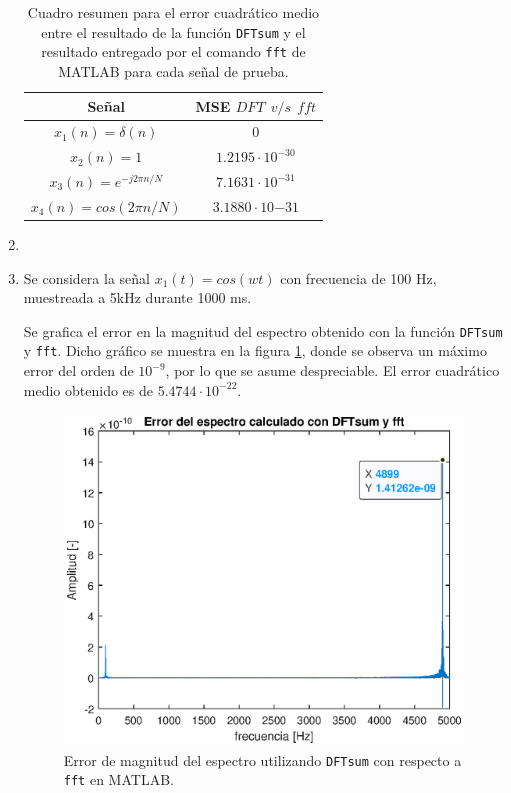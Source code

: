 \begin{enumerate}
 \begin{table}[H]
        \centering
        \begin{tabular}{|c|c|}
        \hline
         Señal    & MSE $DFT~~ v/s~~ fft$  \\
         \hline
         $x_1(n) = \delta (n)$   & $0$ \\
         \hline
          $x_2(n) = 1$   &   $1.2195\cdot 10^{-30}$ \\
         \hline
            $ x_3(n) =e^{-j2 \pi n /N}$ &   $7.1631\cdot 10^{-31} $\\
         \hline
        
         $ x_4(n) = cos(2\pi n /N)$  &    $3.1880\cdot 10{-31}  $\\
         \hline


        \end{tabular}
        \caption{Cuadro resumen para el error cuadrático medio entre el resultado de la función \texttt{DFTsum} y el resultado entregado por el comando \texttt{fft} de MATLAB para cada señal de prueba.}
        \label{MSE}
    \end{table}
    
    \item
    
    
    \item Se considera la señal $x_1(t) = cos(wt)$ con frecuencia de 100 Hz, muestreada a 5kHz durante 1000 ms. 
    
    Se grafica el error en la magnitud del espectro obtenido con la función \texttt{DFTsum} y \texttt{fft}. Dicho gráfico se muestra en la figura \ref{fig:p4_3err}, donde se observa un máximo error del orden de $10^{-9}$, por lo que se asume despreciable. El error cuadrático medio obtenido es de $5.4744 \cdot 10^{-22}$.
    
    \begin{figure}[H]
        \centering
        \includegraphics[width = 0.8\linewidth]{Figuras/p4_3err.eps}
        \caption{Error de magnitud del espectro utilizando \texttt{DFTsum} con respecto a \texttt{fft} en MATLAB.}
        \label{fig:p4_3err}
    \end{figure}
     
     

    

    
\end{enumerate}

